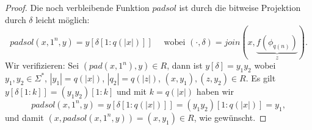 \begin{proof}
    Die noch verbleibende Funktion $\mathit{padsol}$ ist durch die bitweise Projektion durch $\delta$ leicht möglich:
    \[
        \mathit{padsol}(x, 1^n, y) = y[\delta[1:q(|x|)]] \quad\text{ wobei } (\cdot, \delta) = \mathit{join}(x, \underbrace{f(\phi_{q(n)})}_z). \]
    Wir verifizieren: Sei $(\mathit{pad}(x, 1^n), y)\in R$, dann ist $y[\delta]=y_1y_2$ wobei $y_1,y_2\in\Sigma^*$, $|y_1|=q(|x|)$, $|q_2|=q(|z|)$, $(x,y_1), (z, y_2)\in R$. Es gilt $y[\delta[1:k]] = (y_1y_2)[1:k]$
    und mit $k=q(|x|)$ haben wir
    \[ \mathit{padsol}(x, 1^n, y) = y[\delta[1:q(|x|)]] = (y_1y_2)[1:q(|x|)] = y_1, \]
    und damit $(x, \mathit{padsol}(x, 1^n, y)) = (x, y_1)\in R$, wie gewünscht.
\end{proof}

